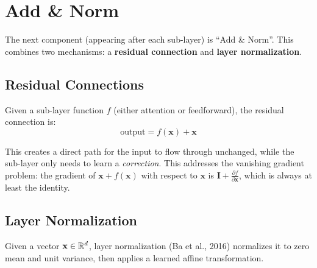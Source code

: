 \documentclass[main.tex]{subfiles}
\begin{document}
\needspace{0.33\textheight}
\section{Add \& Norm}

The next component (appearing after each sub-layer) is ``Add \& Norm''. This combines two mechanisms: a \textbf{residual connection} and \textbf{layer normalization}.

\subsection{Residual Connections}

Given a sub-layer function $f$ (either attention or feedforward), the residual connection is:
$$\text{output} = f(\mathbf{x}) + \mathbf{x}$$

This creates a direct path for the input to flow through unchanged, while the sub-layer only needs to learn a \textit{correction}. This addresses the vanishing gradient problem: the gradient of $\mathbf{x} + f(\mathbf{x})$ with respect to $\mathbf{x}$ is $\mathbf{I} + \frac{\partial f}{\partial \mathbf{x}}$, which is always at least the identity.

\begin{center}
\end{center}

\subsection{Layer Normalization}

Given a vector $\mathbf{x} \in \mathbb{R}^d$, layer normalization (Ba et al., 2016) normalizes it to zero mean and unit variance, then applies a learned affine transformation.
\end{document}
